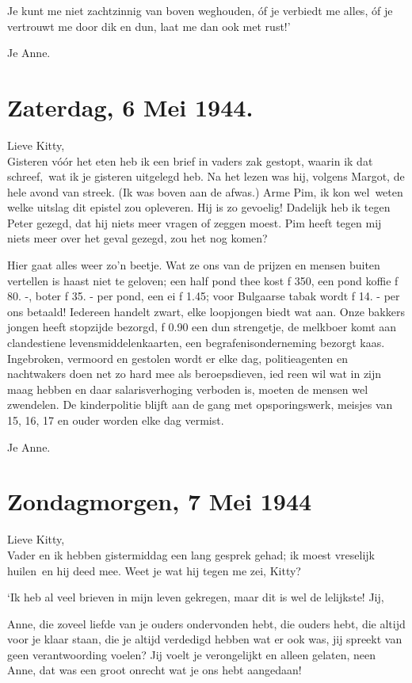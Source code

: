 \documentclass{book}
\begin{document}
Je kunt me niet zachtzinnig van boven weghouden, óf je verbiedt me alles, óf je
vertrouwt me door dik en dun, laat me dan ook met rust!'

Je Anne.

\section*{Zaterdag, 6 Mei 1944.}

Lieve Kitty,\\
Gisteren vóór het eten heb ik een brief in vaders zak gestopt,
waarin ik dat schreef,~wat ik je gisteren uitgelegd heb. Na het lezen was hij,
volgens Margot, de hele avond van streek. (Ik was boven aan de afwas.) Arme Pim,
ik kon wel~weten welke uitslag dit epistel zou opleveren. Hij is zo gevoelig!
Dadelijk heb ik tegen Peter gezegd, dat hij niets meer vragen of zeggen moest.
Pim heeft tegen mij niets meer over het geval gezegd, zou het nog komen?

Hier gaat alles weer zo'n beetje. Wat ze ons van de prijzen en mensen buiten
vertellen is haast niet te geloven; een half pond thee kost ƒ 350, een pond
koffie ƒ 80. -, boter ƒ 35. - per pond, een ei ƒ 1.45; voor Bulgaarse tabak
wordt ƒ 14. - per ons betaald! Iedereen handelt zwart, elke loopjongen biedt wat
aan. Onze bakkers jongen heeft stopzijde bezorgd, ƒ 0.90 een dun strengetje, de
melkboer komt aan clandestiene levensmiddelenkaarten, een begrafenisonderneming
bezorgt kaas.  Ingebroken, vermoord en gestolen wordt er elke dag,
politieagenten en nachtwakers doen net zo hard mee als beroepsdieven, ied reen
wil wat in zijn maag hebben en daar salarisverhoging verboden is, moeten de
mensen wel zwendelen. De kinderpolitie blijft aan de gang met opsporingswerk,
meisjes van 15, 16, 17 en ouder worden elke dag vermist.

Je Anne.

\section*{Zondagmorgen, 7 Mei 1944}

Lieve Kitty,\\
Vader en ik hebben gistermiddag een lang gesprek gehad; ik moest
vreselijk huilen~en hij deed mee. Weet je wat hij tegen me zei, Kitty?

`Ik heb al veel brieven in mijn leven gekregen, maar dit is wel de lelijkste!
Jij,

Anne, die zoveel liefde van je ouders ondervonden hebt, die ouders hebt, die
altijd voor je klaar staan, die je altijd verdedigd hebben wat er ook was, jij
spreekt van geen verantwoording voelen? Jij voelt je verongelijkt en alleen
gelaten, neen Anne, dat was een groot onrecht wat je ons hebt aangedaan!
\end{document}
